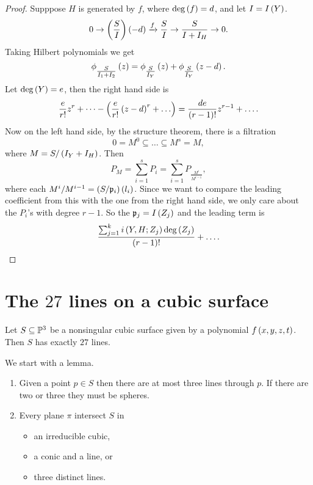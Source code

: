 \begin{proof}
Supppose $ H $ is generated by $ f $, where $ \deg\rb{f} = d $, and let $ I = I\rb{Y} $.
$$ 0 \to \rb{\dfrac{S}{I}}\rb{-d} \xrightarrow{f} \dfrac{S}{I} \to \dfrac{S}{I + I_H} \to 0. $$
Taking Hilbert polynomials we get
$$ \phi_{\tfrac{S}{I_1 + I_2}}\rb{z} = \phi_{\tfrac{S}{I_Y}}\rb{z} + \phi_{\tfrac{S}{I_Y}}\rb{z - d}. $$
Let $ \deg\rb{Y} = e $, then the right hand side is
$$ \dfrac{e}{r!}z^r + \dots - \rb{\dfrac{e}{r!}\rb{z - d}^r + \dots} = \dfrac{de}{\rb{r - 1}!}z^{r - 1} + \dots. $$
Now on the left hand side, by the structure theorem, there is a filtration
$$ 0 = M^0 \subseteq \dots \subseteq M^s = M, $$
where $ M = S / \rb{I_Y + I_H} $. Then
$$ P_M = \sum_{i = 1}^s P_i = \sum_{i = 1}^s P_{\tfrac{M^i}{M^{i - 1}}}, $$
where each $ M^i / M^{i - 1} = \rb{S / \pp_i}\rb{l_i} $. Since we want to compare the leading coefficient from this with the one from the right hand side, we only care about the $ P_i $'s with degree $ r - 1 $. So the $ \pp_j = I\rb{Z_j} $ and the leading term is
$$ \dfrac{\sum_{j = 1}^k i\rb{Y, H; Z_j}\deg\rb{Z_j}}{\rb{r - 1}!} + \dots. $$
\end{proof}

\pagebreak

\section{The $ 27 $ lines on a cubic surface}


\begin{theorem}
Let $ S \subseteq \P^3 $ be a nonsingular cubic surface given by a polynomial $ f\rb{x, y, z, t} $. Then $ S $ has exactly $ 27 $ lines.
\end{theorem}

We start with a lemma.

\begin{lemma}
\hfill
\begin{enumerate}
\item Given a point $ p \in S $ then there are at most three lines through $ p $. If there are two or three they must be spheres.
\item Every plane $ \pi $ intersect $ S $ in
\begin{itemize}
\item an irreducible cubic,
\item a conic and a line, or
\item three distinct lines.
\end{itemize}
\end{enumerate}
\end{lemma}


